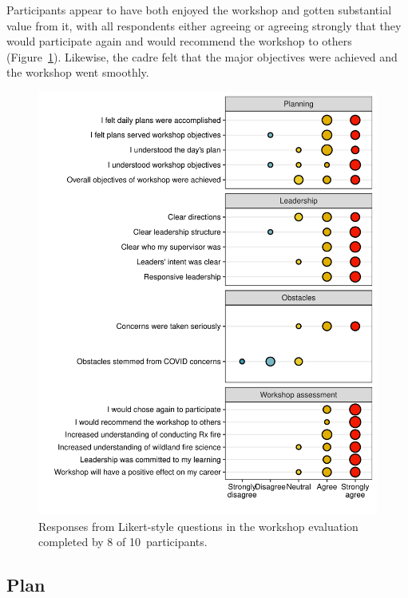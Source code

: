 \documentclass[fire,casereport,accept,moreauthors,pdftex]{Definitions/mdpi}  %
\begin{document}
Participants appear to have both enjoyed the workshop and gotten substantial value from it, with all respondents either agreeing or agreeing strongly that they would participate again and would recommend the workshop to others (Figure~\ref{likert}).
Likewise, the cadre felt that the major objectives were achieved and the workshop went smoothly.

\begin{figure}[H]
\includegraphics[width=0.9\columnwidth]{likert_gg-1.pdf}
\caption{Responses from Likert-style questions in the workshop evaluation completed by 8 of 10~participants. \label{likert}}
\end{figure}

\subsection{Plan}

\end{document}
